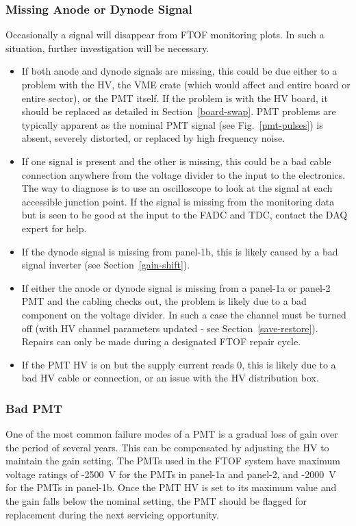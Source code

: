 \documentclass[12pt]{article}
\begin{document}
\subsubsection{Missing Anode or Dynode Signal}
\label{missing}

Occasionally a signal will disappear from FTOF monitoring plots. In such a situation, further
investigation will be necessary. 

\begin{itemize}
\item If both anode and dynode signals are missing, this could be due either to a problem with the 
HV, the VME crate (which would affect and entire board or entire sector), or the PMT itself. If the 
problem is with the HV board, it should be replaced as detailed in Section~\ref{board-swap}. PMT 
problems are typically apparent as the nominal PMT signal (see Fig.~\ref{pmt-pulses}) is absent, 
severely distorted, or replaced by high frequency noise.
\item If one signal is present and the other is missing, this could be a bad cable connection 
anywhere from the voltage divider to the input to the electronics. The way to diagnose is to use 
an oscilloscope to look at the signal at each accessible junction point. If the signal is missing 
from the monitoring data but is seen to be good at the input to the FADC and TDC, contact the DAQ 
expert for help.
\item If the dynode signal is missing from panel-1b, this is likely caused by a bad signal inverter
(see Section~\ref{gain-shift}).
\item If either the anode or dynode signal is missing from a panel-1a or panel-2 PMT and the cabling
checks out, the problem is likely due to a bad component on the voltage divider. In such a case the
channel must be turned off (with HV channel parameters updated - see Section~\ref{save-restore}). 
Repairs can only be made during a designated FTOF repair cycle.
\item If the PMT HV is on but the supply current reads 0, this is likely due to a bad HV cable or
connection, or an issue with the HV distribution box.
\end{itemize}

\subsubsection{Bad PMT}
\label{bad-pmt}

One of the most common failure modes of a PMT is a gradual loss of gain over the period of
several years. This can be compensated by adjusting the HV to maintain the gain setting. The
PMTs used in the FTOF system have maximum voltage ratings of -2500~V for the PMTs in panel-1a
and panel-2, and -2000~V for the PMTs in panel-1b. Once the PMT HV is set to its maximum value
and the gain falls below the nominal setting, the PMT should be flagged for replacement during
the next servicing opportunity.
\end{document}
